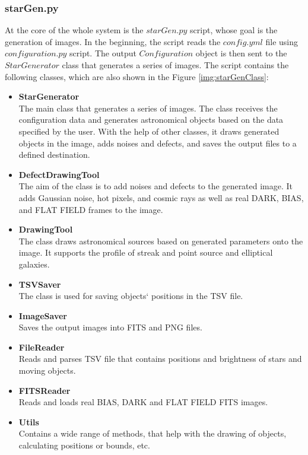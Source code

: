 \subsubsection{starGen.py}
At the core of the whole system is the $starGen.py$ script, whose goal is the generation of images. In the beginning, the script reads the $config.yml$ file using $configuration.py$ script. The output $Configuration$ object is then sent to the $StarGenerator$ class that generates a series of images. The script contains the following classes, which are also shown in the Figure \ref{img:starGenClass}:

\begin{itemize}
    \setlength\itemsep{1px}
    \item \textbf{StarGenerator} \\
    The main class that generates a series of images. The class receives the configuration data and generates astronomical objects based on the data specified by the user. With the help of other classes, it draws generated objects in the image, adds noises and defects, and saves the output files to a defined destination. 
    
    \item \textbf{DefectDrawingTool} \\
    The aim of the class is to add noises and defects to the generated image. It adds Gaussian noise, hot pixels, and cosmic rays as well as real DARK, BIAS, and FLAT FIELD frames to the image. 
    
    \item \textbf{DrawingTool} \\
    The class draws astronomical sources based on generated parameters onto the image. It supports the profile of streak and point source and elliptical galaxies. 
    
    \item \textbf{TSVSaver} \\ 
    The class is used for saving objects‘ positions in the TSV file.
    
    \item \textbf{ImageSaver} \\
    Saves the output images into FITS and PNG files. 
    
    \item \textbf{FileReader} \\
    Reads and parses TSV file that contains positions and brightness of stars and moving objects. 
    
    \item \textbf{FITSReader} \\
    Reads and loads real BIAS, DARK and FLAT FIELD FITS images. 
    
    \item \textbf{Utils} \\
    Contains a wide range of methods, that help with the drawing of objects, calculating positions or bounds, etc. 

\end{itemize}

